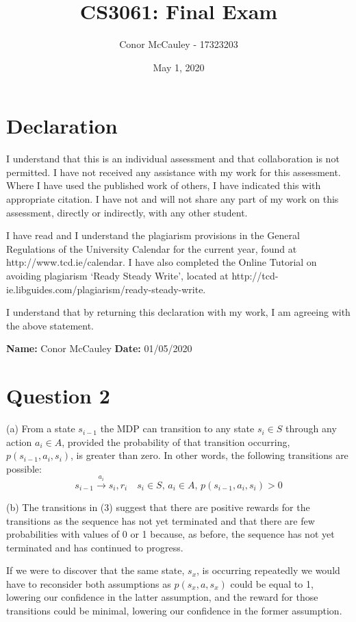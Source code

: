 \documentclass[12pt]{article}
\title{\vspace{-5ex}CS3061: Final Exam\vspace{-2.5ex}}
\author{Conor McCauley - 17323203}
\date{\vspace{-2ex}May 1, 2020\vspace{-2ex}}
\begin{document}
\maketitle

\section*{Declaration}

I understand that this is an individual assessment and that collaboration is not permitted. I have not received any assistance with my work for this assessment. Where I have used the published work of others, I have indicated this with appropriate citation. I have not and will not share any part of my work on this assessment, directly or indirectly, with any other student.

I have read and I understand the plagiarism provisions in the General Regulations of the University Calendar for the current year, found at http://www.tcd.ie/calendar. I have also completed the Online Tutorial on avoiding plagiarism `Ready Steady Write', located at http://tcd-ie.libguides.com/plagiarism/ready-steady-write.

I understand that by returning this declaration with my work, I am agreeing with the above statement.

\indent \textbf{Name:} Conor McCauley \indent \textbf{Date:} 01/05/2020

\section*{Question 2}

\noindent (a) From a state $s_{i-1}$ the MDP can transition to any state $s_i \in S$ through any action $a_i \in A$, provided the probability of that transition occurring, $p(s_{i-1}, a_i, s_i)$, is greater than zero. In other words, the following transitions are possible:
$$s_{i-1} \xrightarrow{a_i} s_i, r_i\quad s_i \in S,\, a_i \in A,\, p(s_{i-1}, a_i, s_i) > 0$$

\noindent (b) The transitions in (3) suggest that there are positive rewards for the transitions as the sequence has not yet terminated and that there are few probabilities with values of 0 or 1 because, as before, the sequence has not yet terminated and has continued to progress.

If we were to discover that the same state, $s_x$, is occurring repeatedly we would have to reconsider both assumptions as $p(s_x, a, s_x)$ could be equal to 1, lowering our confidence in the latter assumption, and the reward for those transitions could be minimal, lowering our confidence in the former assumption.
\end{document}
